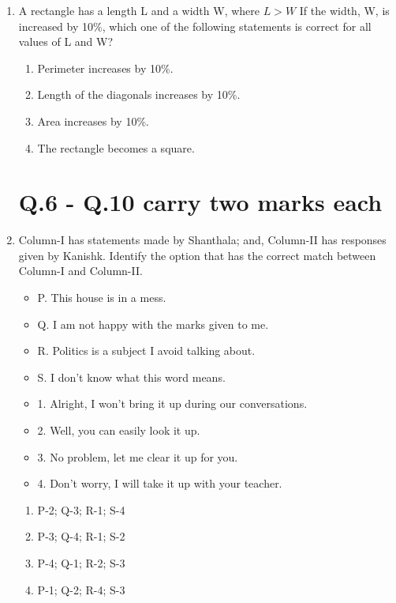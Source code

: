 \documentclass[journal,12pt,onecolumn]{IEEEtran}
\theoremstyle{remark}
\begin{document}
\begin{enumerate}
\item A rectangle has a length L and a width W, where $L>W$ If the width, W, is increased by 10\%, which one of the following statements is correct for all values of L and W?
    \begin{enumerate}
        \item Perimeter increases by 10\%.
        \item Length of the diagonals increases by 10\%.
        \item Area increases by 10\%.
        \item The rectangle becomes a square.
    \end{enumerate}      \hfill{}


\section*{Q.6 - Q.10 carry two marks each}
\item Column-I has statements made by Shanthala; and, Column-II has responses given by Kanishk. Identify the option that has the correct match between Column-I and Column-II.

\begin{itemize}
    \item P. This house is in a mess.
    \item Q. I am not happy with the marks given to me.
    \item R. Politics is a subject I avoid talking about.
    \item S. I don't know what this word means.
\end{itemize}

\begin{itemize}
    \item 1. Alright, I won't bring it up during our conversations.
    \item 2. Well, you can easily look it up.
    \item 3. No problem, let me clear it up for you.
    \item 4. Don't worry, I will take it up with your teacher.
\end{itemize}

    \begin{enumerate}
        \item P-2; Q-3; R-1; S-4
        \item P-3; Q-4; R-1; S-2
        \item P-4; Q-1; R-2; S-3
        \item P-1; Q-2; R-4; S-3
    \end{enumerate}      \hfill{}




\end{enumerate}
\end{document}
